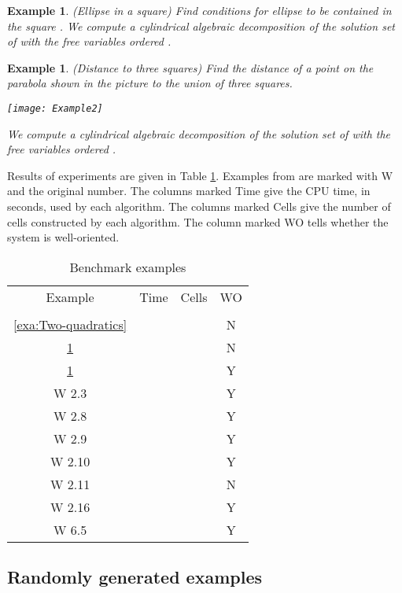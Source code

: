 \documentclass[english]{amsart}
\providecommand{\tabularnewline}{\\}
\numberwithin{equation}{section}
\numberwithin{figure}{section}
\newtheorem{example}[thm]{Example}
\begin{document}
\begin{example}
\label{exa:Ellipse in a square}(Ellipse in a square) Find conditions
for ellipse  to be contained
in the square . We compute a cylindrical algebraic
decomposition of the solution set of
with the free variables ordered .
\end{example}

\begin{example}
\label{exa:Distance to three squares}(Distance to three squares)
Find the distance of a point on the parabola shown in the picture
to the union of three squares.

\texttt{[image: Example2]}

We compute a cylindrical algebraic decomposition of the solution set
of
with the free variables ordered .
\end{example}
Results of experiments are given in Table \ref{tab:Benchmark-examples}.
Examples from \cite{W2} are marked with W and the original number.
The columns marked Time give the CPU time, in seconds, used by each
algorithm. The columns marked Cells give the number of cells constructed
by each algorithm. The column marked WO tells whether the system is
well-oriented.

\begin{table}


\caption{\label{tab:Benchmark-examples}Benchmark examples}
\begin{tabular}{|c|c|c|c|c|c|}
\hline 
Example & \multicolumn{2}{c|}{Time} & \multicolumn{2}{c|}{Cells} & WO\tabularnewline
\cline{2-5} 
 &  &  &  &  & \tabularnewline
\hline 
\ref{exa:Two-quadratics} &  &  &  &  & N\tabularnewline
\hline 
\ref{exa:Ellipse in a square} &  &  &  &  & N\tabularnewline
\hline 
\ref{exa:Distance to three squares} &  &  &  &  & Y\tabularnewline
\hline 
W 2.3 &  &  &  &  & Y\tabularnewline
\hline 
W 2.8 &  &  &  &  & Y\tabularnewline
\hline 
W 2.9 &  &  &  &  & Y\tabularnewline
\hline 
W 2.10 &  &  &  &  & Y\tabularnewline
\hline 
W 2.11 &  &  &  &  & N\tabularnewline
\hline 
W 2.16 &  &  &  &  & Y\tabularnewline
\hline 
W 6.5 &  &  &  &  & Y\tabularnewline
\hline
\end{tabular}


\end{table}



\subsection{Randomly generated examples}
\end{document}

